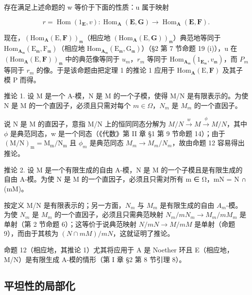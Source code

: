存在满足上述命题的 w 等价于下面的性质：u 属于映射

\[
r = \operatorname{Hom} (1 _ {\mathbf {E}}, v): \operatorname{Hom} _ {\mathbf {A}} (\mathbf {E}, \mathbf {G}) \rightarrow \operatorname{Hom} _ {\mathbf {A}} (\mathbf {E}, \mathbf {F}).
\]

现在，\((\mathrm{Hom}_{\mathbf{A}}(\mathrm{E},\mathbf{F}))_{\mathfrak{m}}\)（相应地 \((\mathrm{Hom}_{\mathbf{A}}(\mathrm{E},\mathbf{G}))_{\mathfrak{m}}\)）典范地等同于 \(\mathrm{Hom}_{\mathbf{A}_{\mathfrak{m}}}(\mathrm{E}_{\mathfrak{m}},\mathrm{F}_{\mathfrak{m}})\)（相应地 \(\mathrm{Hom}_{\mathbf{A}_{\mathfrak{m}}}(\mathrm{E}_{\mathfrak{m}},\mathrm{G}_{\mathfrak{m}})\)）（§2 第 7 节命题 19 (i)），u 在 \((\mathrm{Hom}_{\mathbf{A}}(\mathrm{E},\mathbf{F}))_{\mathfrak{m}}\) 中的典范像等同于 \(u_{m}\)，\(r_{m}\) 等同于 \(\mathrm{Hom}_{\mathbf{A}_{\mathfrak{m}}}(1_{\mathbf{E}_{\mathfrak{m}}},v_{\mathfrak{m}})\)，而 \(P_{m}\) 等同于 \(r_{m}\) 的像。于是该命题由把定理 1 的推论 1 应用于 \(\mathrm{Hom}_{\mathbf{A}}(\mathrm{E},\mathbf{F})\) 及其子模 P 而得。

推论 1. 设 M 是一个 A-模，N 是 M 的一个子模，使得 M/N 是有限表示的。为使 N 是 M 的一个直因子，必须且只需对每个 \(m \in \Omega\)，\(N_{m}\) 是 \(M_{m}\) 的一个直因子。

说 N 是 M 的直因子，意指 M/N 上的恒同同态分解为 \(M/N \xrightarrow{w} M \xrightarrow{\phi} M/N\)，其中 \(\phi\) 是典范同态，w 是一个同态（《代数》第 II 章 §1 第 9 节命题 14）；由于 \((\mathrm{M}/\mathrm{N})_{\mathrm{m}} = \mathrm{M}_{\mathrm{m}}/\mathrm{N}_{\mathrm{m}}\) 且 \(\phi_{m}\) 是典范同态 \(M_{m} \to M_{m}/N_{m}\)，故由命题 12 容易得出推论。

推论 2. 设 M 是一个有限生成的自由 A-模，N 是 M 的一个子模且是有限生成的自由 A-模。为使 N 是 M 的一个直因子，必须且只需对所有 m ∈ Ω，mN = N ∩ (mM)。

按定义 M/N 是有限表示的；另一方面，\(N_{m}\) 与 \(M_{m}\) 是有限生成的自由 \(A_{m}\)-模。为使 \(N_{m}\) 是 \(M_{m}\) 的一个直因子，必须且只需典范映射 \(N_{m}/mN_{m} \rightarrow M_{m}/mM_{m}\) 是单射（第 2 节命题 6）；这等价于说典范映射 \(N/mN \rightarrow M/mM\) 是单射（命题 9），而由于其核为 \((N \cap mM)/mN\)，这就证明了推论。

命题 12（相应地，其推论 1）尤其将应用于 A 是 Noether 环且 E（相应地，M/N）是有限生成 A-模的情形（第 I 章 §2 第 8 节引理 8）。

\subsection{平坦性的局部化}

